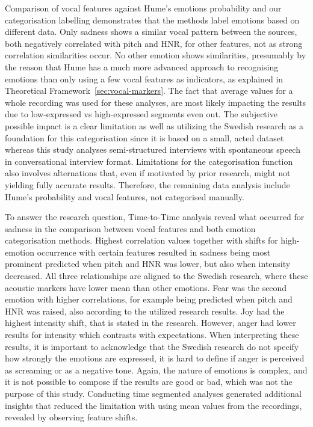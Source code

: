 Comparison of vocal features against Hume’s emotions probability and our categorisation labelling demonstrates that the methods label emotions based on different data. Only sadness shows a similar vocal pattern between the sources, both negatively correlated with pitch and HNR, for other features, not as strong correlation similarities occur. 
No other emotion shows similarities, presumably by the reason that Hume has a much more advanced approach to recognising emotions than only using a few vocal features as indicators, as explained in Theoretical Framework~\ref{sec:vocal-markers}.  The fact that average values for a whole recording was used for these analyses, are most likely impacting the results due to low-expressed vs high-expressed segments even out.  
The subjective possible impact is a clear limitation as well as utilizing the Swedish research as a foundation for this categorisation since it is based on a small, acted dataset whereas this study analyses semi-structured interviews with spontaneous speech in conversational interview format. Limitations for the categorisation function also involves alternations that, even if motivated by prior research, might not yielding fully accurate results. 
Therefore, the remaining data analysis include Hume's probability and vocal features, not categorised manually.

To answer the research question, Time-to-Time analysis reveal what occurred for sadness in the comparison between vocal features and both emotion categorisation methods. Highest correlation values together with shifts for high-emotion occurrence with certain features resulted in sadness being most prominent predicted when pitch and HNR was lower, but also when intensity decreased. 
All three relationships are aligned to the Swedish research, where these acoustic markers have lower mean than other emotions. 
Fear was the second emotion with higher correlations, for example being predicted when pitch and HNR was raised, also according to the utilized research results. Joy had the highest intensity shift, that is stated in the research. However, anger had lower results for intensity which contrasts with expectations. 
When interpreting these results, it is important to acknowledge that the Swedish research do not specify how strongly the emotions are expressed, it is hard to define if anger is perceived as screaming or as a negative tone. 
Again, the nature of emotions is complex, and it is not possible to compose if the results are good or bad, which was not the purpose of this study. Conducting time segmented analyses generated additional insights that reduced the limitation with using mean values from the recordings, revealed by observing feature shifts. 



